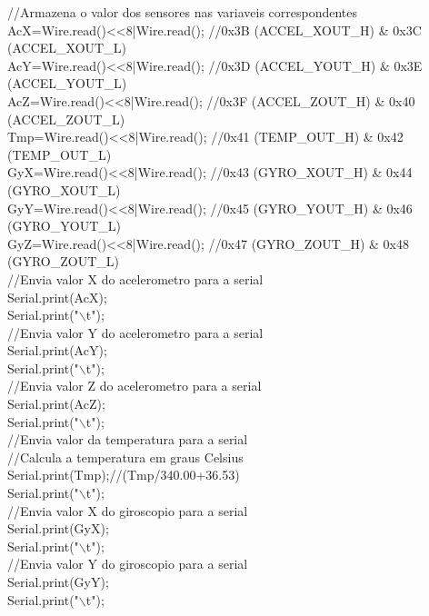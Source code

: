 \begin{apendicesenv}
//Armazena o valor dos sensores nas variaveis correspondentes\\
AcX=Wire.read()<<8|Wire.read();  //0x3B (ACCEL\_XOUT\_H) \& 0x3C (ACCEL\_XOUT\_L)    \\ 
AcY=Wire.read()<<8|Wire.read();  //0x3D (ACCEL\_YOUT\_H) \& 0x3E (ACCEL\_YOUT\_L)\\
AcZ=Wire.read()<<8|Wire.read();  //0x3F (ACCEL\_ZOUT\_H) \& 0x40 (ACCEL\_ZOUT\_L)\\
Tmp=Wire.read()<<8|Wire.read();  //0x41 (TEMP\_OUT\_H) \& 0x42 (TEMP\_OUT\_L)\\
GyX=Wire.read()<<8|Wire.read();  //0x43 (GYRO\_XOUT\_H) \& 0x44 (GYRO\_XOUT\_L)\\
GyY=Wire.read()<<8|Wire.read();  //0x45 (GYRO\_YOUT\_H) \& 0x46 (GYRO\_YOUT\_L)\\
GyZ=Wire.read()<<8|Wire.read();  //0x47 (GYRO\_ZOUT\_H) \& 0x48 (GYRO\_ZOUT\_L)\\


//Envia valor X do acelerometro para a serial\\
Serial.print(AcX);\\
Serial.print("$\backslash$t");\\

//Envia valor Y do acelerometro para a serial\\ 
Serial.print(AcY);\\  
Serial.print("$\backslash$t");\\

//Envia valor Z do acelerometro para a serial\\
Serial.print(AcZ);\\
Serial.print("$\backslash$t");\\

//Envia valor da temperatura para a serial\\
//Calcula a temperatura em graus Celsius\\
Serial.print(Tmp);//(Tmp/340.00+36.53)\\
Serial.print("$\backslash$t");\\

//Envia valor X do giroscopio para a serial\\ 
Serial.print(GyX);\\
Serial.print("$\backslash$t");\\

//Envia valor Y do giroscopio para a serial\\   
Serial.print(GyY);\\
Serial.print("$\backslash$t");\\


\end{apendicesenv}
